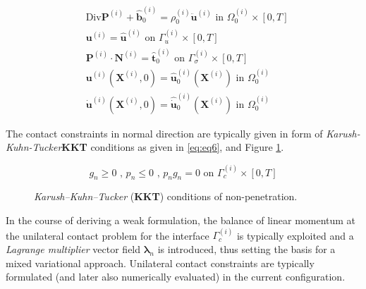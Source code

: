 \documentclass[a4paper,10pt]{article} %
\begin{document}
\begin{subequations}\label{eq:eq0}
\begin{align}
 & \text{Div} \mathbf{P}^{(i)}+\hat{\mathbf{b}}_0^{(i)}=\rho_0^{(i)}\ddot{\mathbf{u}}^{(i)} \text{ in } \Omega_0^{(i)} \times [0, T] \label{eq:subeq1}\\
 & \mathbf{u}^{(i)} = \hat{\mathbf{u}}^{(i)} \text{ on } \Gamma_u^{(i)} \times [0, T] \label{eq:subeq2}\\
 & \mathbf{P}^{(i)} \cdot \mathbf{N}^{(i)} = \hat{\mathbf{t}}_0^{(i)} \text{ on } \Gamma_\sigma^{(i)} \times [0, T] \label{eq:subeq3} \\
 & \mathbf{u}^{(i)}\left( \mathbf{X}^{(i)}, 0\right) = \hat{\mathbf{u}}_0^{(i)}\left( \mathbf{X}^{(i)}\right) \text{ in } \Omega_0^{(i)} \label{eq:subeq4} \\
 & \dot{\mathbf{u}}^{(i)}\left( \mathbf{X}^{(i)}, 0\right) = \hat{\dot{\mathbf{u}}}_0^{(i)}\left( \mathbf{X}^{(i)}\right) \text{ in } \Omega_0^{(i)} \label{eq:subeq5}
 \end{align}
\end{subequations}

The contact constraints in normal direction are typically given in form of \textit{Karush-Kuhn-Tucker}\textbf{KKT} conditions as given in \eqref{eq:eq6}, and Figure \ref{fig:kkt}.
 
 \begin{equation}\label{eq:eq6}
g_n \geq 0 \text{ , } p_n \leq 0 \text{ , } p_n g_n = 0 \text{ on } \Gamma_c^{(i)} \times [0, T]
 \end{equation}

\begin{figure}[h]
\begin{center}
\caption{\textit{Karush–Kuhn–Tucker} (\textbf{KKT}) conditions of non-penetration.}
\label{fig:kkt}
\end{center}
\end{figure}

In the course of deriving a weak formulation, the balance of linear momentum at the unilateral contact problem  for the interface $\Gamma_c^{(i)}$ is typically exploited and a \textit{Lagrange multiplier} vector field $\boldsymbol{\lambda}_n$ is introduced, thus setting the basis for a mixed variational approach. Unilateral contact constraints are typically
formulated (and later also numerically evaluated) in the current configuration.
\end{document}
